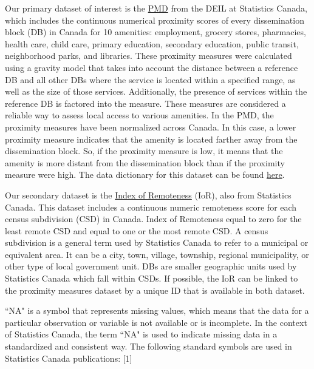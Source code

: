 \documentclass[11pt, a4paper]{article}
\begin{document}
Our primary dataset of interest is the \href{https://www150.statcan.gc.ca/n1/pub/17-26-0002/2020001/csv/pmd-eng.zip}{PMD} from the DEIL at Statistics Canada, which includes the continuous numerical proximity scores of every dissemination block (DB) in Canada for 10 amenities: employment, grocery stores, pharmacies, health care, child care, primary education, secondary education, public transit, neighborhood parks, and libraries. These proximity measures were calculated using a gravity model that takes into account the distance between a reference DB and all other DBs where the service is located within a specified range, as well as the size of those services. Additionally, the presence of services within the reference DB is factored into the measure. These measures are considered a reliable way to assess local access to various amenities. In the PMD, the proximity measures have been normalized across Canada. In this case, a lower proximity measure indicates that the amenity is located farther away from the dissemination block. So, if the proximity measure is low, it means that the amenity is more distant from the dissemination block than if the proximity measure were high. The data dictionary for this dataset can be found \href{https://www150.statcan.gc.ca/n1/pub/71-607-x/71-607-x2020011-eng.htm}{here}.
\par
Our secondary dataset is the \href{https://www150.statcan.gc.ca/n1/pub/17-26-0001/172600012020001-eng.htm}{Index of Remoteness} (IoR), also from Statistics Canada. This dataset includes a continuous numeric remoteness score for each census subdivision (CSD) in Canada. Index of Remoteness equal to zero for the least remote CSD and equal to one or the most remote CSD. A census subdivision is a general term used by Statistics Canada to refer to a municipal or equivalent area. It can be a city, town, village, township, regional municipality, or other type of local government unit. DBs are smaller geographic units used by Statistics Canada which fall within CSDs. 
If possible, the IoR can be linked to the proximity measures dataset by a unique ID that is available in both dataset. 
\par 
``NA" is a symbol that represents missing values, which means that the data for a particular observation or variable is not available or is incomplete. In the context of Statistics Canada, the term ``NA" is used to indicate missing data in a standardized and consistent way. The following standard symbols are used in Statistics Canada publications: [1] 
\end{document}
